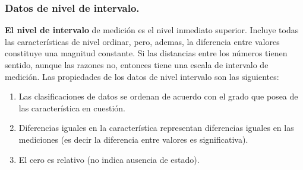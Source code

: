 \documentclass[]{article}
\begin{document}
\subsubsection*{Datos de nivel de intervalo.}
\textbf{El nivel de intervalo} de medición es el nivel inmediato superior. Incluye todas las características de nivel ordinar, pero, ademas, la diferencia entre valores constituye una magnitud constante. Si las distancias entre los números tienen sentido, aunque las razones no, entonces tiene una escala de intervalo de medición. Las propiedades de los datos de nivel intervalo son las siguientes:
\begin{enumerate}
	\item Las clasificaciones de datos se ordenan de acuerdo con el grado que posea de las característica en cuestión.
	\item Diferencias iguales en la característica representan diferencias iguales en las mediciones (es decir la diferencia entre valores es significativa).
	\item El cero es relativo (no indica ausencia de estado).
\end{enumerate}
\end{document}
